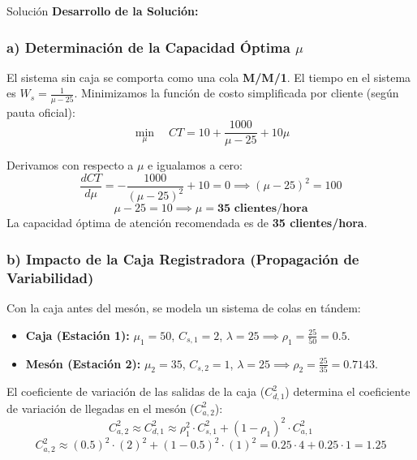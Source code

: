 \documentclass[11pt, a4paper]{article}
\begin{document}
  \medskip
  \begin{ejercicio}{Solución}
  \textbf{Desarrollo de la Solución:}

  \subsubsection*{a) Determinación de la Capacidad Óptima $\mu$}
  El sistema sin caja se comporta como una cola \textbf{M/M/1}.
  El tiempo en el sistema es $W_s = \frac{1}{\mu - 25}$.
  Minimizamos la función de costo simplificada por cliente (según pauta oficial):
  \begin{equation*}
    \min_{\mu} \quad CT = 10 + \frac{1000}{\mu - 25} + 10 \mu
  \end{equation*}

  Derivamos con respecto a $\mu$ e igualamos a cero:
  \begin{equation*}
    \frac{dCT}{d\mu} = -\frac{1000}{(\mu - 25)^2} + 10 = 0 \implies (\mu - 25)^2 = 100
  \end{equation*}
  \begin{equation*}
    \mu - 25 = 10 \implies \mu = \mathbf{35 \text{ clientes/hora}}
  \end{equation*}
  La capacidad óptima de atención recomendada es de \textbf{35 clientes/hora}.

  \subsubsection*{b) Impacto de la Caja Registradora (Propagación de Variabilidad)}
  Con la caja antes del mesón, se modela un sistema de colas en tándem:
  \begin{itemize}
    \item \textbf{Caja (Estación 1):} $\mu_1 = 50$, $C_{s,1} = 2$, $\lambda = 25 \implies \rho_1 = \frac{25}{50} = 0.5$.
    \item \textbf{Mesón (Estación 2):} $\mu_2 = 35$, $C_{s,2} = 1$, $\lambda = 25 \implies \rho_2 = \frac{25}{35} = 0.7143$.
  \end{itemize}

  El coeficiente de variación de las salidas de la caja ($C_{d,1}^2$) determina el coeficiente de variación de llegadas en el mesón ($C_{a,2}^2$):
  \begin{equation*}
    C_{a,2}^2 \approx C_{d,1}^2 \approx \rho_1^2 \cdot C_{s,1}^2 + (1 - \rho_1)^2 \cdot C_{a,1}^2
  \end{equation*}
  \begin{equation*}
    C_{a,2}^2 \approx (0.5)^2 \cdot (2)^2 + (1 - 0.5)^2 \cdot (1)^2 = 0.25 \cdot 4 + 0.25 \cdot 1 = 1.25
  \end{equation*}


\end{ejercicio}
\end{document}
